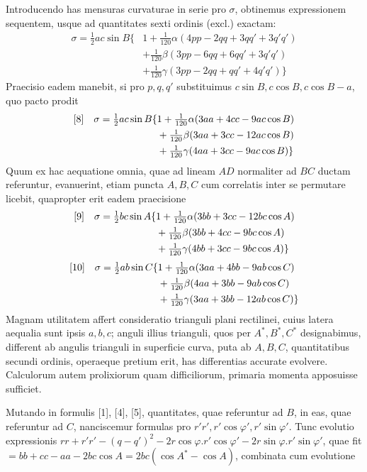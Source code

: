 %
Introducendo has mensuras curvaturae in serie pro \(\sigma\), obtinemus expressionem sequentem, usque ad quantitates sexti ordinis (excl.) exactam:
\[
\begin{aligned}
\sigma=\tfrac{1}{2}ac\sin B\{&1+\tfrac{1}{120}\alpha(4pp-2qq+3qq'+3q'q')\\
&+\tfrac{1}{120}\beta(3pp-6qq+6qq'+3q'q')\\
&+\tfrac{1}{120}\gamma(3pp-2qq+qq'+4q'q')\}
\end{aligned}
\]
Praecisio eadem manebit, si pro \(p,q,q'\) substituimus \(c\sin B,c\cos B,c\cos B-a\), quo pacto prodit
\[
\begin{aligned}
\relax[8]\quad\sigma=\tfrac{1}{2}ac\sin B\{&1+\tfrac{1}{120}\alpha(3aa+4cc-9ac\cos B)\\
&+\tfrac{1}{120}\beta(3aa+3cc-12ac\cos B)\\
&+\tfrac{1}{120}\gamma(4aa+3cc-9ac\cos B)\}
\end{aligned}
\]
Quum ex hac aequatione omnia, quae ad lineam \(AD\) normaliter ad \(BC\) ductam referuntur, evanuerint, etiam puncta \(A,B,C\) cum correlatis inter se permutare licebit, quapropter erit eadem praecisione
\[
\begin{aligned}
\relax[9]\quad\sigma=\tfrac{1}{2}bc\sin A\{&1+\tfrac{1}{120}\alpha(3bb+3cc-12bc\cos A)\\
&+\tfrac{1}{120}\beta(3bb+4cc-9bc\cos A)\\
&+\tfrac{1}{120}\gamma(4bb+3cc-9bc\cos A)\}
\end{aligned}
\]
\[
\begin{aligned}
\relax[10]\quad\sigma=\tfrac{1}{2}ab\sin C\{&1+\tfrac{1}{120}\alpha(3aa+4bb-9ab\cos C)\\
&+\tfrac{1}{120}\beta(4aa+3bb-9ab\cos C)\\
&+\tfrac{1}{120}\gamma(3aa+3bb-12ab\cos C)\}
\end{aligned}
\]
Magnam utilitatem affert consideratio trianguli plani rectilinei, cuius latera aequalia sunt ipsis \(a,b,c\); anguli illius trianguli, quos per \(A^*,B^*,C^*\) designabimus, different ab angulis trianguli in superficie curva, puta ab \(A,B,C\), quantitatibus secundi ordinis, operaeque pretium erit, has differentias accurate evolvere. Calculorum autem prolixiorum quam difficiliorum, primaria momenta apposuisse sufficiet.

Mutando in formulis [1], [4], [5], quantitates, quae referuntur ad \(B\), in eas, quae referuntur ad \(C\), nanciscemur formulas pro \(r'r',r'\cos\varphi',r'\sin\varphi'\). Tunc evolutio expressionis \(rr+r'r'-(q-q')^2-2r\cos\varphi\mathord{.}r'\cos\varphi'-2r\sin\varphi\mathord{.}r'\sin\varphi'\), quae fit \(=bb+cc-aa-2bc\cos A=2bc(\cos A^*-\cos A)\), combinata cum evolutione
